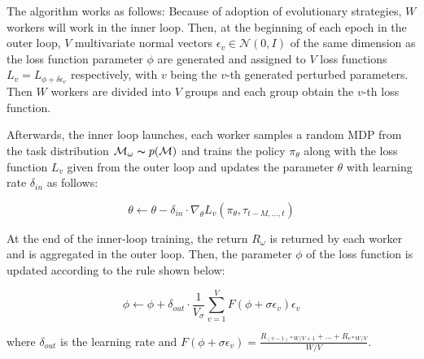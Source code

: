 \par
The algorithm works as follows: Because of adoption of evolutionary strategies, $\textit{W}$ workers will work in the inner loop. Then, at the beginning of each epoch in the outer loop, $\textit{V}$ multivariate normal vectors $\epsilon_v \in \mathcal{N}(0,I)$ of the same dimension as the loss function parameter $\phi$ are generated and assigned to $\textit{V}$ loss functions $L_v = L_{\phi+\delta\epsilon_v}$ respectively, with $\textit{v}$ being the $\textit{v}$-th generated perturbed parameters. Then $\textit{W}$ workers are divided into $\textit{V}$ groups and each group obtain the $\textit{v}$-th loss function.

\par
Afterwards, the inner loop launches, each worker samples a random MDP from the task distribution $\mathcal{M}_\omega\thicksim p(\mathcal{M})$ and trains the policy $\pi_\theta$ along with the loss function $L_v$ given from the outer loop and updates the parameter $\theta$ with learning rate $\delta_{in}$ as follows:

\[\theta\gets\theta - \delta_{in}\cdot\nabla_\theta L_v(\pi_\theta,\tau_{t-M,...,t})\]

\par
At the end of the inner-loop training, the return $R_\omega$ is returned by each worker and is aggregated in the outer loop. Then, the parameter $\phi$ of the loss function is updated according to the rule shown below:

\[\phi\gets\phi+\delta_{out}\cdot\frac{1}{V_\sigma}\sum_{v=1}^{V}F(\phi+\sigma\epsilon_v)\epsilon_v\]

where $\delta_{out}$ is the learning rate and $F(\phi+\sigma\epsilon_v) = \frac{R_{(v-1)*W/V+1}+...+R_{v*W/V}}{W/V}$.

